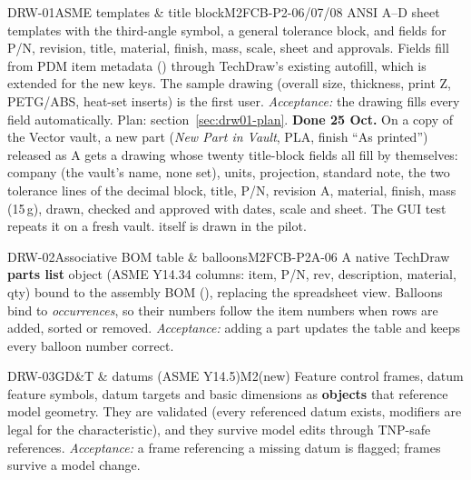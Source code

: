 \begin{epic}{DRW-01}{ASME templates \& title block}{M2}{\stDone}{FCB-P2-06/07/08}
ANSI A--D sheet templates with the third-angle symbol, a general tolerance block, and fields for P/N, revision,
title, material, finish, mass, scale, sheet and approvals. Fields fill from PDM item metadata
() through TechDraw's existing autofill, which is extended for the new keys. The 
sample drawing (overall size, thickness, print Z, PETG/ABS, heat-set inserts) is the first user.
\emph{Acceptance:} the  drawing fills every field automatically. Plan: section~\ref{sec:drw01-plan}.
\textbf{Done 25 Oct.} On a copy of the Vector vault, a new part (\emph{New Part in Vault}, PLA, finish ``As printed'')
released as A gets a drawing whose twenty title-block fields all fill by themselves: company (the vault's name, none
set), units, projection, standard note, the two tolerance lines of the decimal block, title, P/N, revision A,
material, finish, mass (15\,g), drawn, checked and approved with dates, scale and sheet. The GUI test
 repeats it on a fresh vault.  itself is drawn in the
 pilot.
\end{epic}



\begin{epic}{DRW-02}{Associative BOM table \& balloons}{M2}{\stTodo}{FCB-P2A-06}
A native TechDraw \textbf{parts list} object (ASME Y14.34 columns: item, P/N, rev, description,
material, qty) bound to the assembly BOM (), replacing the spreadsheet view. Balloons bind to
\emph{occurrences}, so their numbers follow the item numbers when rows are added, sorted or removed.
\emph{Acceptance:} adding a part updates the table and keeps every balloon number correct.
\end{epic}

\begin{epic}{DRW-03}{GD\&T \& datums (ASME Y14.5)}{M2}{\stTodo}{(new)}
Feature control frames, datum feature symbols, datum targets and basic dimensions as \textbf{objects}
that reference model geometry. They are validated (every referenced datum exists, modifiers are legal for the
characteristic), and they survive model edits through TNP-safe references.
\emph{Acceptance:} a frame referencing a missing datum is flagged; frames survive a model change.
\end{epic}

